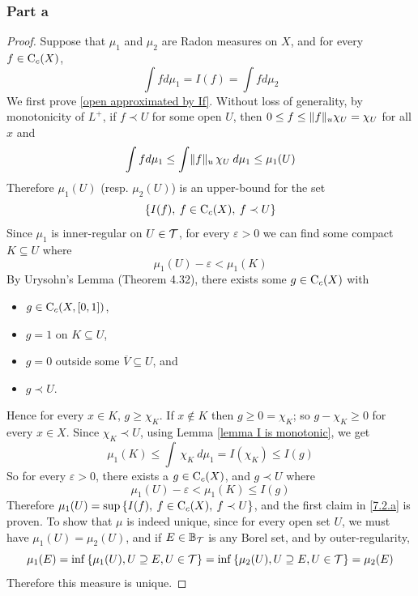 \documentclass[../../main.tex]{subfiles}
\begin{document}
\subsubsection{Part a}
\begin{proof}
    Suppose that $\mu_1$ and $\mu_2$ are Radon measures on $X$, and for every $f\in\operatorname{C}_c({X})$,
    \[
    \int fd\mu_1 = I(f) = \int fd\mu_2
    \]
    We first prove \eqref{open approximated by If}. Without loss of generality, by monotonicity of $L^+$, if $f\prec U$ for some open $U$, then $0\leq f\leq \lVert {f} \rVert_u\chi_U=\chi_U$ for all $x$ and
    \[
    \int fd\mu_1\leq \int \lVert {f} \rVert_u\,\chi_U\:d\mu_1 \leq \mu_1(U)
    \]
    Therefore $\mu_1(U)$ (resp. $\mu_2(U)$) is an upper-bound for the set
    \[
    \left\{I(f),\:f\in\operatorname{C}_c({X}),\:f\prec U\right\}
    \]
    Since $\mu_1$ is inner-regular on $U\in\mathcal{T}$, for every $\varepsilon>0$ we can find some compact $K\subseteq U$ where
    \[
    \mu_1(U)-\varepsilon<\mu_1(K)
    \]
    By Urysohn's Lemma (Theorem 4.32), there exists some $g\in\operatorname{C}_c({X})$ with
    \begin{itemize}
        \item $g\in\operatorname{C}_c({X,[0,1]})$,
        \item $g=1$ on $K\subseteq U$,
        \item $g=0$ outside some $\overline{V}\subseteq U$, and
        \item $g\prec U$.
    \end{itemize}
    Hence for every $x\in K$, $g\geq \chi_K$. If $x\notin K$ then $g\geq 0 = \chi_K$; so $g-\chi_K\geq 0$ for every $x\in X$. Since $\chi_K\prec U$, using Lemma \ref{lemma I is monotonic}, we get
    \[
    \mu_1(K)\leq \int\,\chi_K\:d\mu_1=I(\chi_K)\leq I(g)
    \]
    So for every $\varepsilon>0$, there exists a $g\in\operatorname{C}_c({X})$, and $g\prec U$ where
    \[
    \mu_1(U)-\varepsilon<\mu_1(K)\leq I(g)
    \]
    Therefore $\mu_1(U) = \sup\left\{I(f),\:f\in\operatorname{C}_c({X}),\:f\prec U\right\}$, and the first claim in \ref{7.2.a} is proven. To show that $\mu$ is indeed unique, since for every open set $U$, we must have $\mu_1(U)=\mu_2(U)$, and if $E\in\mathbb{B}_{\mathcal{T}}$ is any Borel set, and by outer-regularity,
    \[
    \mu_1(E) = \inf\left\{\mu_1(U), U\supseteq E, U\in\mathcal{T}\right\} = \inf\left\{\mu_2(U), U\supseteq E, U\in\mathcal{T}\right\}=\mu_2(E)
    \]
    Therefore this measure is unique.
\end{proof}
%
%
\end{document}
